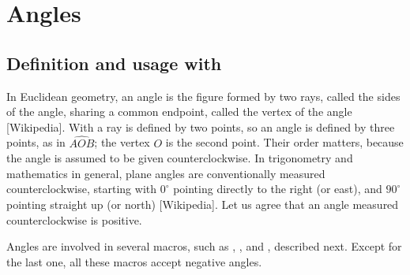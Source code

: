 \section{Angles} 
\subsection{Definition and usage with }
In Euclidean geometry, an angle is the figure formed by two rays, called the sides of the angle, sharing a common endpoint, called the vertex of the angle [Wikipedia]. With  a ray is defined by two points, so an angle is defined by three points, as in $\widehat{AOB}$; the vertex $O$ is the second point. Their order matters, because the angle is assumed to be given counterclockwise.
In trigonometry and mathematics in general, plane angles are conventionally measured counterclockwise, starting with $0^\circ$  pointing directly to the right (or east), and $90^\circ$ pointing straight up (or north) [Wikipedia].
Let us agree that an angle measured counterclockwise is positive.

  \begin{center}
  \end{center}
  
 Angles are involved in several macros, such as , , 
 and , described next. Except for the last one, all these macros accept negative angles.
 
